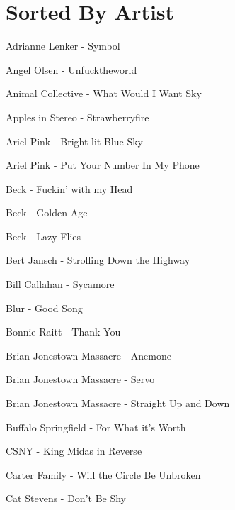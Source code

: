 \section*{Sorted By Artist}
Adrianne Lenker - Symbol \dotfill \pageref{Symbol - Adrianne Lenker} 

Angel Olsen - Unfucktheworld \dotfill \pageref{Unfucktheworld - Angel Olsen} 

Animal Collective - What Would I Want Sky \dotfill \pageref{What Would I Want Sky - Animal Collective} 

Apples in Stereo - Strawberryfire \dotfill \pageref{Strawberryfire - Apples in Stereo} 

Ariel Pink - Bright lit Blue Sky \dotfill \pageref{Bright lit Blue Sky - Ariel Pink} 

Ariel Pink - Put Your Number In My Phone \dotfill \pageref{Put Your Number In My Phone - Ariel Pink} 

Beck - Fuckin' with my Head \dotfill \pageref{Fuckin' with my Head - Beck} 

Beck - Golden Age \dotfill \pageref{Golden Age - Beck} 

Beck - Lazy Flies \dotfill \pageref{Lazy Flies - Beck} 

Bert Jansch - Strolling Down the Highway \dotfill \pageref{Strolling Down the Highway - Bert Jansch} 

Bill Callahan - Sycamore \dotfill \pageref{Sycamore - Bill Callahan} 

Blur - Good Song \dotfill \pageref{Good Song - Blur} 

Bonnie Raitt - Thank You \dotfill \pageref{Thank You - Bonnie Raitt} 

Brian Jonestown Massacre - Anemone \dotfill \pageref{Anemone - Brian Jonestown Massacre} 

Brian Jonestown Massacre - Servo \dotfill \pageref{Servo - Brian Jonestown Massacre} 

Brian Jonestown Massacre - Straight Up and Down \dotfill \pageref{Straight Up and Down - Brian Jonestown Massacre} 

Buffalo Springfield - For What it's Worth \dotfill \pageref{For What it's Worth - Buffalo Springfield} 

CSNY - King Midas in Reverse \dotfill \pageref{King Midas in Reverse - CSNY} 

Carter Family - Will the Circle Be Unbroken \dotfill \pageref{Will the Circle Be Unbroken - Carter Family} 

Cat Stevens - Don't Be Shy \dotfill \pageref{Don't Be Shy - Cat Stevens} 

